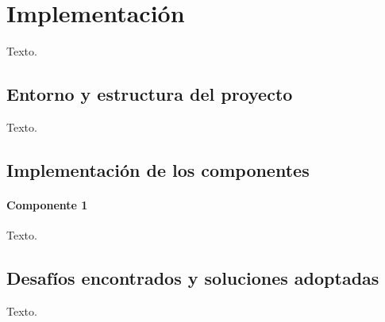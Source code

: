 \chapter{Implementación}
Texto.

\section{Entorno y estructura del proyecto}
Texto.

\section{Implementación de los componentes}
\subsubsection{Componente 1}
Texto.

\section{Desafíos encontrados y soluciones adoptadas}
Texto.
